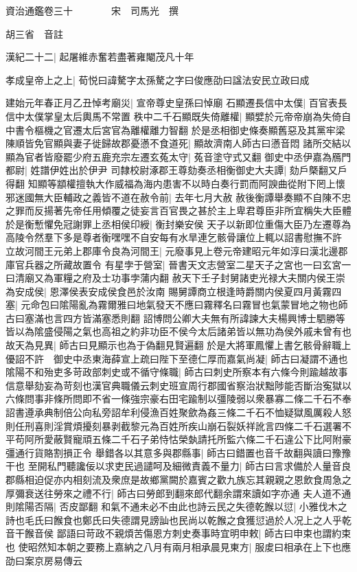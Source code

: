 資治通鑑卷三十　　　　宋　司馬光　撰

胡三省　音註

漢紀二十二|{
	起屠維赤奮若盡著雍閹茂凡十年}


孝成皇帝上之上|{
	荀悦曰諱驁字太孫驁之字曰俊應劭曰諡法安民立政曰成}


建始元年春正月乙丑悼考廟災|{
	宣帝尊史皇孫曰悼廟}
石顯遷長信中太僕|{
	百官表長信中太僕掌皇太后輿馬不常置}
秩中二千石顯既失倚離權|{
	顯嬖於元帝帝崩為失倚自中書令樞機之官遷太后宮官為離權離力智翻}
於是丞相御史條奏顯舊惡及其黨牢梁陳順皆免官顯與妻子徙歸故郡憂懣不食道死|{
	顯故濟南人師古曰懣音悶}
諸所交結以顯為官者皆廢罷少府五鹿充宗左遷玄菟太守|{
	菟音塗守式又翻}
御史中丞伊嘉為鴈門都尉|{
	姓譜伊姓出於伊尹}
司隸校尉涿郡王尊劾奏丞相衡御史大夫譚|{
	劾戶槩翻又戶得翻}
知顯等顓權擅執大作威福為海内患害不以時白奏行罰而阿諛曲從附下罔上懷邪迷國無大臣輔政之義皆不道在赦令前|{
	去年七月大赦}
赦後衡譚舉奏顯不自陳不忠之罪而反揚著先帝任用傾覆之徒妄言百官畏之甚於主上卑君尊臣非所宜稱失大臣體於是衡慙懼免冠謝罪上丞相侯印綬|{
	衡封樂安侯}
天子以新即位重傷大臣乃左遷尊為高陵令然羣下多是尊者衡嘿嘿不自安每有水旱連乞骸骨讓位上輒以詔書慰撫不許　立故河間王元弟上郡庫令良為河間王|{
	元廢事見上卷元帝建昭元年如淳曰漢北邊郡庫官兵器之所藏故置令}
有星孛于營室|{
	晉書天文志營室二星天子之宮也一曰玄宮一曰清廟又為軍糧之府及士功事孛蒲内翻}
赦天下壬子封舅諸吏光禄大夫關内侯王崇為安成侯|{
	恩澤侯表安成侯食邑於汝南}
賜舅譚商立根逢時爵關内侯夏四月黃霧四塞|{
	元命包曰隂陽亂為霧爾雅曰地氣發天不應曰霧釋名曰霧冒也氣蒙冒地之物也師古曰塞滿也言四方皆滿塞悉則翻}
詔博問公卿大夫無有所諱諫大夫楊興博士駟勝等皆以為隂盛侵陽之氣也高祖之約非功臣不侯今太后諸弟皆以無功為侯外戚未曾有也故天為見異|{
	師古曰見顯示也為于偽翻見賢遍翻}
於是大將軍鳳懼上書乞骸骨辭職上優詔不許　御史中丞東海薛宣上疏曰陛下至德仁厚而嘉氣尚凝|{
	師古曰凝謂不通也}
隂陽不和殆吏多苛政部刺史或不循守條職|{
	師古曰刺史所察本有六條今則踰越故事信意舉劾妄為苛刻也漢官典職儀云刺史班宣周行郡國省察治狀黜陟能否斷治寃獄以六條問事非條所問即不省一條強宗豪右田宅踰制以彊陵弱以衆暴寡二條二千石不奉詔書遵承典制倍公向私旁詔牟利侵漁百姓聚歛為姦三條二千石不恤疑獄風厲殺人怒則任刑喜則淫賞煩擾刻暴剥截黎元為百姓所疾山崩石裂妖祥訛言四條二千石選署不平苟阿所愛蔽賢寵頑五條二千石子弟恃怙榮埶請托所監六條二千石違公下比阿附豪彊通行貨賂割損正令}
舉錯各以其意多與郡縣事|{
	師古曰錯置也音千故翻與讀曰豫豫干也}
至開私門聽讒佞以求吏民過譴呵及細微責義不量力|{
	師古曰言求備於人量音良}
郡縣相迫促亦内相刻流及衆庶是故鄉黨闕於嘉賓之歡九族忘其親親之恩飲食周急之厚彌衰送往勞來之禮不行|{
	師古曰勞郎到翻來郎代翻余謂來讀如字亦通}
夫人道不通則隂陽否隔|{
	否皮鄙翻}
和氣不通未必不由此也詩云民之失德乾餱以愆|{
	小雅伐木之詩也毛氏曰餱食也鄭氏曰失德謂見謗訕也民尚以乾餱之食獲愆過於人况上之人乎乾音干餱音侯}
鄙語曰苛政不親煩苦傷恩方刺史奏事時宜明申敕|{
	師古曰申束也謂約束也}
使昭然知本朝之要務上嘉納之八月有兩月相承晨見東方|{
	服䖍曰相承在上下也應劭曰案京房易傳云}


